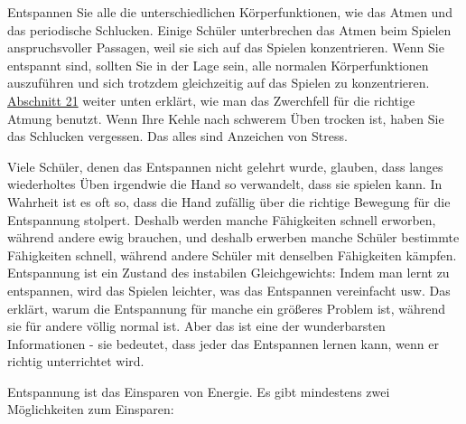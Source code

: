 Entspannen Sie alle die unterschiedlichen Körperfunktionen, wie das Atmen und das periodische Schlucken.
Einige Schüler unterbrechen das Atmen beim Spielen anspruchsvoller Passagen, weil sie sich auf das Spielen konzentrieren.
Wenn Sie entspannt sind, sollten Sie in der Lage sein, alle normalen Körperfunktionen auszuführen und sich trotzdem gleichzeitig auf das Spielen zu konzentrieren.
\hyperlink{c1ii21}{Abschnitt 21} weiter unten erklärt, wie man das Zwerchfell für die richtige Atmung benutzt.
Wenn Ihre Kehle nach schwerem Üben trocken ist, haben Sie das Schlucken vergessen.
Das alles sind Anzeichen von Stress.

Viele Schüler, denen das Entspannen nicht gelehrt wurde, glauben, dass langes wiederholtes Üben irgendwie die Hand so verwandelt, dass sie spielen kann.
In Wahrheit ist es oft so, dass die Hand zufällig über die richtige Bewegung für die Entspannung stolpert.
Deshalb werden manche Fähigkeiten schnell erworben, während andere ewig brauchen, und deshalb erwerben manche Schüler bestimmte Fähigkeiten schnell, während andere Schüler mit denselben Fähigkeiten kämpfen.
Entspannung ist ein Zustand des instabilen Gleichgewichts: Indem man lernt zu entspannen, wird das Spielen leichter, was das Entspannen vereinfacht usw.
Das erklärt, warum die Entspannung für manche ein größeres Problem ist, während sie für andere völlig normal ist.
Aber das ist eine der wunderbarsten Informationen - sie bedeutet, dass jeder das Entspannen lernen kann, wenn er richtig unterrichtet wird.

Entspannung ist das Einsparen von Energie.
Es gibt mindestens zwei Möglichkeiten zum Einsparen:

